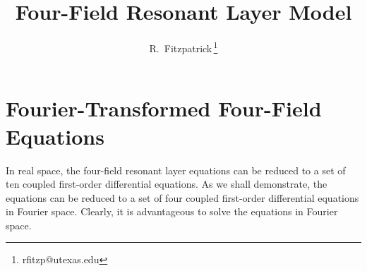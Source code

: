 \documentclass[12pt,prb,aps,notitlepage]{revtex4-1}
\begin{document}
\title{Four-Field Resonant Layer Model}
\author{R.~Fitzpatrick\,\footnote{rfitzp@utexas.edu}}
\begin{abstract}
\end{abstract}
\maketitle

\section{Fourier-Transformed Four-Field Equations}
In real space, the four-field resonant layer equations can be reduced to a set of ten coupled first-order differential equations.
As we shall demonstrate, the equations can be reduced to a set of four coupled first-order differential
equations in Fourier space. Clearly, it is advantageous to solve the equations in Fourier space.
\end{document}
